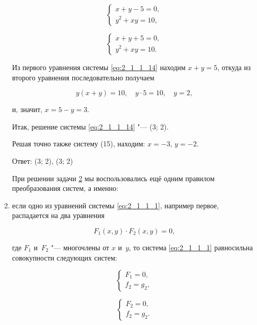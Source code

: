 \begin{enumerate}
\begin{equation}\label{eq:2_1_1_14}
\begin{cases}
x + y - 5 = 0, \\
y^{2} + xy = 10,
\end{cases}
\end{equation}

\begin{equation}\label{eq:2_1_1_15}
\begin{cases}
x + y + 5 = 0, \\
y^{2} + xy = 10.
\end{cases}
\end{equation}

Из первого уравнения системы \eqref{eq:2_1_1_14} находим $x + y = 5$,
откуда из второго уравнения последовательно получаем

\begin{equation*}
y(x + y) = 10, \quad y \cdot 5 = 10, \quad y = 2,
\end{equation*}

и, значит, $x = 5 - y = 3$.

Итак, решение системы \eqref{eq:2_1_1_14} "--- (3; 2).

Решая точно также систему (15), находим: $x = -3$, $y = -2$.

Ответ: (3; 2), (3; 2)

При решении задачи \hyperlink{ex:2_1_1_2}{2} мы воспользовались ещё одним правилом
преобразования систем, а именно:

\item \label{itm:2_1_1_4} если одно из уравнений системы \eqref{eq:2_1_1_1},
например первое, распадается на два уравнения

\begin{equation*}
F_{1}(x, y) \cdot F_{2}(x, y) = 0, 
\end{equation*}

где $F_{1}$ и~$F_{2}$ "--- многочлены от $x$ и~$y$, то система \eqref{eq:2_1_1_1}
равносильна совокупности следующих систем:

\begin{equation}\label{eq:2_1_1_16}
\begin{cases}
F_{1} = 0, \\
f_{2} = g_{2},
\end{cases}
\end{equation}

\begin{equation}\label{eq:2_1_1_17}
\begin{cases}
F_{2} = 0, \\
f_{2} = g_{2}.
\end{cases}
\end{equation}


\end{enumerate}
